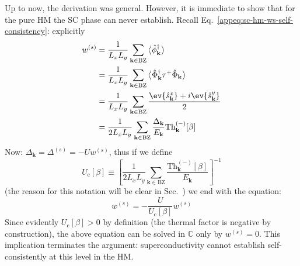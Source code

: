 {Up to now, the derivation was general. However, it is immediate to show that for the pure HM the SC phase can never establish. Recall Eq.~\eqref{appeq:sc-hm-ws-self-consistency}: explicitly
\begin{align}
	w^{(s)} &= \frac{1}{L_x L_y} \sum_{\mathbf{k}\in\mathrm{BZ}} \big\langle
		\hat \phi_\mathbf{k}^\dagger
	\big\rangle \nonumber \\
	&= \frac{1}{L_x L_y} \sum_{\mathbf{k}\in\mathrm{BZ}} \big\langle
		\hat \Phi_\mathbf{k}^\dagger \tau^+ \hat \Phi_\mathbf{k}
	\big\rangle \nonumber \\
	&= \frac{1}{L_x L_y} \sum_{\mathbf{k}\in\mathrm{BZ}} \frac{	
		\ev{\hat s_\mathbf{k}^x} + i \ev{\hat s_\mathbf{k}^y}
	}{2} \nonumber \\
	&= \frac{1}{2 L_x L_y} \sum_{\mathbf{k}\in\mathrm{BZ}} \frac{\Delta_\mathbf{k}}{E_\mathbf{k}} \mathrm{Th}_\mathbf{k}^{(-)}[\beta] \label{appeq:sc-hm-ws-self-consistency-2}
\end{align}
Now: $\Delta_\mathbf{k} = \Delta^{(s)} = -U w^{(s)}$, thus if we define
\begin{equation}\label{eq:sc-Uc}
	U_\mathrm{c}[\beta] \equiv \left[
		\frac{1}{2 L_x L_y} \sum_{\mathbf{k}\in\mathrm{BZ}} \frac{\mathrm{Th}_\mathbf{k}^{(-)}[\beta]}{E_\mathbf{k}}
	\right]^{-1}
\end{equation}
(the reason for this notation will be clear in Sec.~\mref) we end with the equation:
\[
	w^{(s)} = -\frac{U}{U_\mathrm{c}[\beta]} w^{(s)}
\]
Since evidently $U_\mathrm{c}[\beta] > 0$ by definition (the thermal factor is negative by construction), the above equation can be solved in $\mathbb{C}$ only by $w^{(s)}=0$. This implication terminates the argument: superconductivity cannot establish self-consistently at this level in the HM.

}
